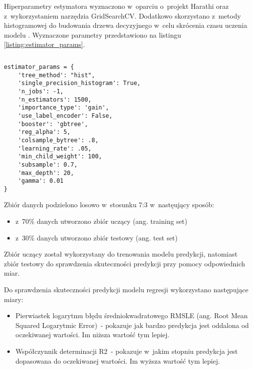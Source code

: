 Hiperparametry estymatora wyznaczono w~oparciu o~projekt Harathi \cite{harathi-2018} oraz z~wykorzystaniem narzędzia GridSearchCV.
Dodatkowo skorzystano z~metody histogramowej do budowania drzewa decyzyjnego w~celu skrócenia czasu uczenia modelu \cite{golarnyk-2021}.
Wyznaczone parametry przedstawiono na listingu \ref{listing:estimator_params}.


\noindent\begin{minipage}{\textwidth}
             \begin{lstlisting}[caption={Parametry estmatora}, label={listing:estimator_params}]
             \end{lstlisting}
             \hspace{.075\textwidth}\begin{minipage}{.85\textwidth}
                                        \begin{verbatim}
estimator_params = {
    'tree_method': "hist",
    'single_precision_histogram': True,
    'n_jobs': -1,
    'n_estimators': 1500,
    'importance_type': 'gain',
    'use_label_encoder': False,
    'booster': 'gbtree',
    'reg_alpha': 5,
    'colsample_bytree': .8,
    'learning_rate': .05,
    'min_child_weight': 100,
    'subsample': 0.7,
    'max_depth': 20,
    'gamma': 0.01
}
                                        \end{verbatim}
             \end{minipage}

             \raggedright\source{\ownwork}
             \vspace{0.75cm}
\end{minipage}

Zbiór danych podzielono losowo w~stosunku 7:3 w~nastęujący sposób:
\begin{itemize}
    \item z~70\% danych utworzono zbiór uczący (ang. training set)
    \item z~30\% danych utworzono zbiór testowy (ang. test set)
\end{itemize}

Zbiór uczący został wykorzystany do trenowania modelu predykcji, natomiast zbiór testowy do sprawdzenia skuteczności predykcji przy pomocy odpowiednich miar.

Do sprawdzenia skuteczności predykcji modelu regresji wykorzystano następujące miary:
\begin{itemize}
    \item Pierwiastek logarytmu błędu średniokwadratowego RMSLE (ang. Root Mean Squared Logarytmic Error)~- pokazuje jak bardzo predykcja jest oddalona od oczekiwanej wartości. Im niższa wartość tym lepiej.
    \item Współczynnik determinacji R2~- pokazuje w~jakim stopniu predykcja jest dopasowana do oczekiwanej wartości. Im wyższa wartość tym lepiej.
\end{itemize}

